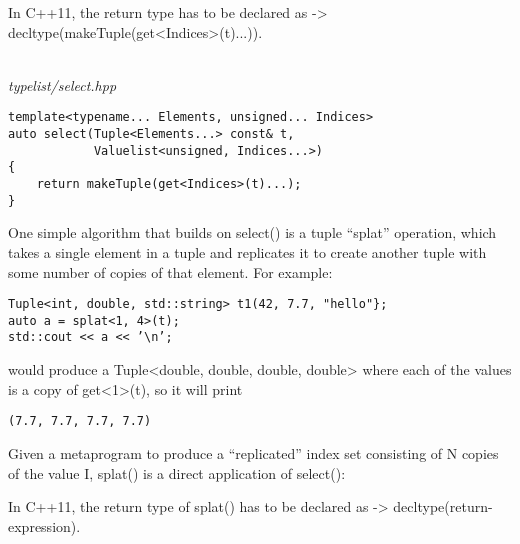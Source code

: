 \begin{tcolorbox}[colback=webgreen!5!white,colframe=webgreen!75!black]
\hspace*{0.75cm}In C++11, the return type has to be declared as -> decltype(makeTuple(get<Indices>(t)...)).
\end{tcolorbox}

\hspace*{\fill} \\ %
\noindent
\textit{typelist/select.hpp}
\begin{lstlisting}[style=styleCXX]
template<typename... Elements, unsigned... Indices>
auto select(Tuple<Elements...> const& t,
			Valuelist<unsigned, Indices...>)
{
	return makeTuple(get<Indices>(t)...);
}
\end{lstlisting}

One simple algorithm that builds on select() is a tuple “splat” operation, which takes a single element in a tuple and replicates it to create another tuple with some number of copies of that element. For example:

\begin{lstlisting}[style=styleCXX]
Tuple<int, double, std::string> t1(42, 7.7, "hello"};
auto a = splat<1, 4>(t);
std::cout << a << ’\n’;
\end{lstlisting}

would produce a Tuple<double, double, double, double> where each of the values is a copy of get<1>(t), so it will print

\begin{lstlisting}[style=styleCXX]
(7.7, 7.7, 7.7, 7.7)
\end{lstlisting}

Given a metaprogram to produce a “replicated” index set consisting of N copies of the value I, splat() is a direct application of select():

\begin{tcolorbox}[colback=webgreen!5!white,colframe=webgreen!75!black]
\hspace*{0.75cm}In C++11, the return type of splat() has to be declared as -> decltype(return-expression).
\end{tcolorbox}

